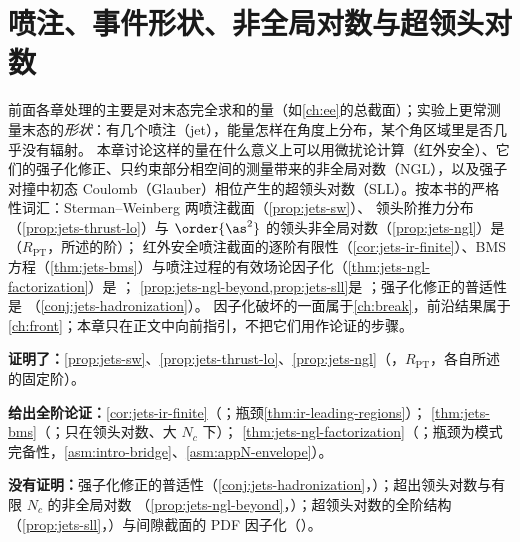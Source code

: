 \chapter{喷注、事件形状、非全局对数与超领头对数}\label{ch:jets}

前面各章处理的主要是对末态完全求和的量（如\cref{ch:ee}的总截面）；实验上更常测量末态的\emph{形状}：有几个喷注（jet），能量怎样在角度上分布，某个角区域里是否几乎没有辐射。
本章讨论这样的量在什么意义上可以用微扰论计算（红外安全）、它们的强子化修正、只约束部分相空间的测量带来的非全局对数（NGL），以及强子对撞中初态 Coulomb（Glauber）相位产生的超领头对数（SLL）。按本书的严格性词汇：Sterman--Weinberg 两喷注截面（\cref{prop:jets-sw}）、
领头阶推力分布（\cref{prop:jets-thrust-lo}）与 $\order{\as^2}$ 的领头非全局对数（\cref{prop:jets-ngl}）是 \tagR（$R_{\mathrm{PT}}$，所述的阶）；
红外安全喷注截面的逐阶有限性（\cref{cor:jets-ir-finite}）、BMS 方程（\cref{thm:jets-bms}）与喷注过程的有效场论因子化（\cref{thm:jets-ngl-factorization}）是 \tagA；
\cref{prop:jets-ngl-beyond,prop:jets-sll}是 \tagP；强子化修正的普适性是 \tagC（\cref{conj:jets-hadronization}）。
因子化破坏的一面属于\cref{ch:break}，前沿结果属于\cref{ch:front}；本章只在正文中向前指引，不把它们用作论证的步骤。

\begin{tcolorbox}[enhanced,breakable,title=本章证明了什么／没有证明什么,fonttitle=\bfseries,
  colback=gray!3!white,colframe=gray!55!black,boxrule=0.6pt,arc=2pt,
  left=5pt,right=5pt,top=3pt,bottom=3pt,before skip=6pt,after skip=6pt]
\textbf{证明了：}\cref{prop:jets-sw}、\cref{prop:jets-thrust-lo}、\cref{prop:jets-ngl}（\tagR，$R_{\mathrm{PT}}$，各自所述的固定阶）。\par
\textbf{给出全阶论证：}\cref{cor:jets-ir-finite}（\tagA；瓶颈\cref{thm:ir-leading-regions}）；
\cref{thm:jets-bms}（\tagA；只在领头对数、大 $N_c$ 下）；
\cref{thm:jets-ngl-factorization}（\tagA；瓶颈为模式完备性，\cref{asm:intro-bridge}、\cref{asm:appN-envelope}）。\par
\textbf{没有证明：}强子化修正的普适性（\cref{conj:jets-hadronization}，\tagC）；超出领头对数与有限 $N_c$ 的非全局对数
（\cref{prop:jets-ngl-beyond}，\tagP）；超领头对数的全阶结构（\cref{prop:jets-sll}，\tagP）与间隙截面的 PDF 因子化（\tagC）。
\end{tcolorbox}


